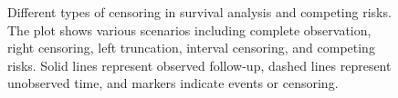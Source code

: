 \begin{figure}[htbp]
    \caption{Different types of censoring in survival analysis and competing risks. The plot shows various scenarios including complete observation, right censoring, left truncation, interval censoring, and competing risks. Solid lines represent observed follow-up, dashed lines represent unobserved time, and markers indicate events or censoring.}
    \label{fig:censoring}
\end{figure}

